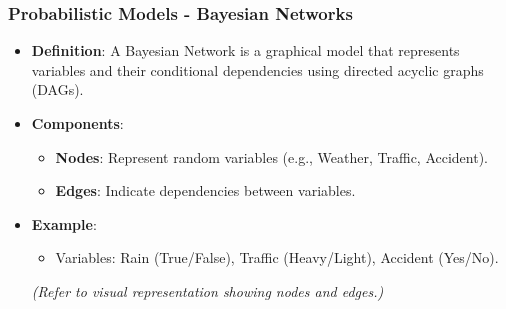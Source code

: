 \documentclass[aspectratio=169]{beamer}
\begin{document}
\begin{frame}[fragile]
    \frametitle{Probabilistic Models - Bayesian Networks}
    \begin{itemize}
        \item \textbf{Definition}:
        A Bayesian Network is a graphical model that represents variables and their conditional dependencies using directed acyclic graphs (DAGs).
        
        \item \textbf{Components}:
        \begin{itemize}
            \item \textbf{Nodes}: Represent random variables (e.g., Weather, Traffic, Accident).
            \item \textbf{Edges}: Indicate dependencies between variables.
        \end{itemize}
        
        \item \textbf{Example}:
        \begin{itemize}
            \item Variables: Rain (True/False), Traffic (Heavy/Light), Accident (Yes/No).
        \end{itemize}
        \pause
        \textit{(Refer to visual representation showing nodes and edges.)}
    \end{itemize}
\end{frame}
\end{document}

